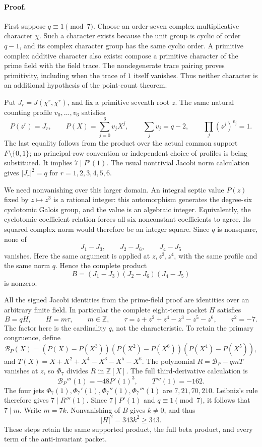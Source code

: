 \documentclass[11pt]{article}
\begin{document}
\paragraph{Proof.}
First suppose \(q\equiv1\pmod7\). Choose an order-seven complex
multiplicative character \(\chi\). Such a character exists because the
unit group is cyclic of order \(q-1\), and its complex character group
has the same cyclic order. A primitive complex additive character also
exists: compose a primitive character of the prime field with the field
trace. The nondegenerate trace pairing proves primitivity, including
when the trace of \(1\) itself vanishes. Thus neither character is an
additional hypothesis of the point-count theorem.

Put \(J_r=J(\chi^r,\chi^r)\), and fix a primitive seventh root \(z\).
The same natural counting profile \(v_0,\ldots,v_6\) satisfies
\[
 P(z^r)=J_r,\qquad P(X)=\sum_{j=0}^6v_jX^j,\qquad
 \sum_jv_j=q-2,\qquad \prod_j(z^j)^{v_j}=1.
\]
The last equality follows from the product over the actual common
support \(F\setminus\{0,1\}\); no principal-row convention or independent
choice of profiles is being substituted. It implies \(7\mid P'(1)\).
The usual nontrivial Jacobi norm calculation gives
\(|J_r|^2=q\) for \(r=1,2,3,4,5,6\).

We need nonvanishing over this larger domain. An integral septic value
\(P(z)\) fixed by \(z\mapsto z^3\) is a rational integer: this automorphism
generates the degree-six cyclotomic Galois group, and the value is an
algebraic integer. Equivalently, the cyclotomic coefficient relation
forces all six nonconstant coefficients to agree. Its squared complex
norm would therefore be an integer square. Since \(q\) is nonsquare,
none of
\[
 J_1-J_3,\qquad J_2-J_6,\qquad J_4-J_5
\]
vanishes. Here the same argument is applied at \(z,z^2,z^4\), with the
same profile and the same norm \(q\). Hence the complete product
\[
 B=(J_1-J_3)(J_2-J_6)(J_4-J_5)
\]
is nonzero.

All the signed Jacobi identities from the prime-field proof are
identities over an arbitrary finite field. In particular the complete
eight-term packet \(H\) satisfies
\[
 B=qH,\qquad H=m\tau,\qquad m\in\mathbb Z,\qquad
 \tau=z+z^2+z^4-z^3-z^5-z^6,\qquad \tau^2=-7.
\]
The factor here is the cardinality \(q\), not the characteristic.
To retain the primary congruence, define
\[
 \mathcal B_P(X)=(P(X)-P(X^3))(P(X^2)-P(X^6))
                         (P(X^4)-P(X^5)),
\]
and \(T(X)=X+X^2+X^4-X^3-X^5-X^6\).
The polynomial \(R=\mathcal B_P-qmT\) vanishes at \(z\), so
\(\Phi_7\) divides \(R\) in \(\mathbb Z[X]\).
The full third-derivative calculation is
\[
 \mathcal B_P'''(1)=-48P'(1)^3,\qquad T'''(1)=-162.
\]
The four jets \(\Phi_7(1),\Phi_7'(1),\Phi_7''(1),\Phi_7'''(1)\)
are \(7,21,70,210\). Leibniz's rule therefore gives \(7\mid R'''(1)\).
Since \(7\mid P'(1)\) and \(q\equiv1\pmod7\), it follows that \(7\mid m\).
Write \(m=7k\). Nonvanishing of \(B\) gives \(k\ne0\), and thus
\[
 |H|^2=343k^2\ge343.
\]
These steps retain the same supported product, the full beta product,
and every term of the anti-invariant packet.
\end{document}
